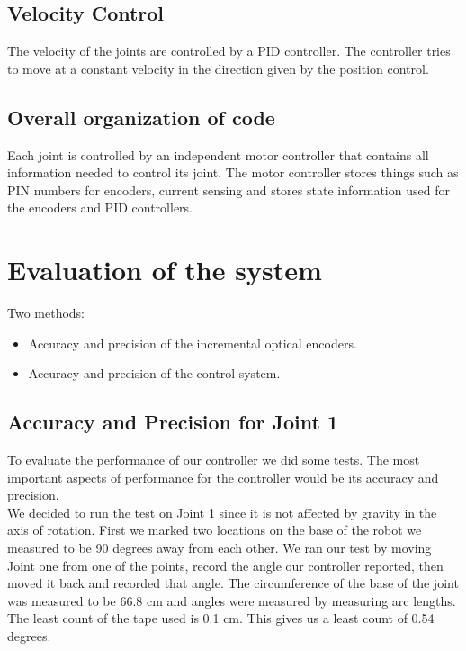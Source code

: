 \documentclass[10pt,a4paper]{article}
\begin{document}
\subsection{Velocity Control}
The velocity of the joints are controlled by a PID controller. The controller tries to move at a constant velocity in the direction given by the position control. 

\subsection{Overall organization of code}
Each joint is controlled by an independent motor controller that contains all information needed to control its joint. The motor controller stores things such as PIN numbers for encoders, current sensing and stores state information used for the encoders and PID controllers.

\section{Evaluation of the system}
Two methods:
\begin{itemize}
\item Accuracy and precision of the incremental optical encoders.
\item Accuracy and precision of the control system.
\end{itemize}

\subsection{Accuracy and Precision for Joint 1}
To evaluate the performance of our controller we did some tests. The most important aspects of performance for the controller would be its accuracy and precision. \\

We decided to run the test on Joint 1 since it is not affected by gravity in the axis of rotation. First we marked two locations on the base of the robot we measured to be 90 degrees away from each other.  We ran our test by moving Joint one from one of the points, record the angle our controller reported, then moved it back and recorded that angle. The circumference of the base of the joint was measured to be 66.8 cm and angles were measured by measuring arc lengths. The least count of the tape used is 0.1 cm. This gives us a least count of 0.54 degrees.\\
\end{document}
